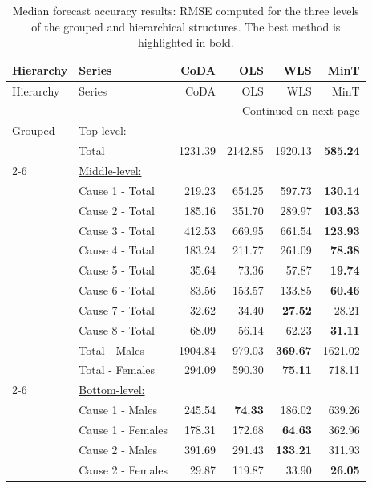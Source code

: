 \begin{center}
\tabcolsep 0.315in
\renewcommand\arraystretch{0.98}
\begin{small}
\begin{longtable}{@{}llrrrr@{}}
\caption{\small Median forecast accuracy results: RMSE computed for the three levels of the grouped and hierarchical structures. The best method is highlighted in bold.}\label{tab:rmse_median} \\
\toprule
Hierarchy & Series & CoDA & OLS & WLS & MinT \\
\midrule
\endfirsthead
\toprule
Hierarchy & Series & CoDA & OLS & WLS & MinT \\
\midrule
\endhead
\hline \multicolumn{6}{r}{{Continued on next page}} \\
\endfoot
\endlastfoot
Grouped & \multicolumn{5}{l}{\underline{Top-level:}}\\
& Total & 1231.39 & 2142.85 & 1920.13 & \textbf{585.24} \\
\cmidrule{2-6}
& \multicolumn{5}{l}{\underline{Middle-level:}}\\
& Cause 1 - Total & 219.23 & 654.25 & 597.73 & \textbf{130.14} \\
& Cause 2 - Total & 185.16 & 351.70 & 289.97 & \textbf{103.53} \\
& Cause 3 - Total & 412.53 & 669.95 & 661.54 & \textbf{123.93} \\
& Cause 4 - Total & 183.24 & 211.77 & 261.09 & \textbf{78.38} \\
& Cause 5 - Total & 35.64 & 73.36 & 57.87 & \textbf{19.74} \\
& Cause 6 - Total & 83.56 & 153.57 & 133.85 & \textbf{60.46} \\
& Cause 7 - Total & 32.62 & 34.40 & \textbf{27.52} & 28.21 \\
& Cause 8 - Total & 68.09 & 56.14 & 62.23 & \textbf{31.11} \\
& Total - Males & 1904.84 & 979.03 & \textbf{369.67} & 1621.02 \\
& Total - Females & 294.09 & 590.30 & \textbf{75.11} & 718.11 \\
\cmidrule{2-6}
& \multicolumn{5}{l}{\underline{Bottom-level:}}\\
& Cause 1 - Males & 245.54 & \textbf{74.33} & 186.02 & 639.26 \\
& Cause 1 - Females & 178.31 & 172.68 & \textbf{64.63} & 362.96 \\
& Cause 2 - Males & 391.69 & 291.43 & \textbf{133.21} & 311.93 \\
& Cause 2 - Females & 29.87 & 119.87 & 33.90 & \textbf{26.05} \\

\end{longtable}
\end{small}
\end{center}
